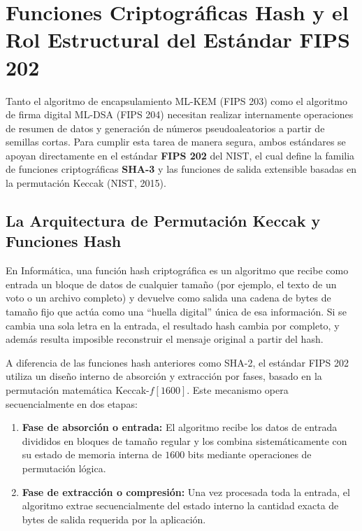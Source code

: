 \section{Funciones Criptográficas Hash y el Rol Estructural del Estándar FIPS 202}

Tanto el algoritmo de encapsulamiento ML-KEM (FIPS 203) como el algoritmo de firma digital ML-DSA (FIPS 204) necesitan realizar internamente operaciones de resumen de datos y generación de números pseudoaleatorios a partir de semillas cortas. Para cumplir esta tarea de manera segura, ambos estándares se apoyan directamente en el estándar \textbf{FIPS 202} del NIST, el cual define la familia de funciones criptográficas \textbf{SHA-3} y las funciones de salida extensible basadas en la permutación Keccak (NIST, 2015).

\subsection{La Arquitectura de Permutación Keccak y Funciones Hash}

En Informática, una función hash criptográfica es un algoritmo que recibe como entrada un bloque de datos de cualquier tamaño (por ejemplo, el texto de un voto o un archivo completo) y devuelve como salida una cadena de bytes de tamaño fijo que actúa como una ``huella digital'' única de esa información. Si se cambia una sola letra en la entrada, el resultado hash cambia por completo, y además resulta imposible reconstruir el mensaje original a partir del hash.

A diferencia de las funciones hash anteriores como SHA-2, el estándar FIPS 202 utiliza un diseño interno de absorción y extracción por fases, basado en la permutación matemática Keccak-$f[1600]$. Este mecanismo opera secuencialmente en dos etapas:

\begin{enumerate}
	\item \textbf{Fase de absorción o entrada:} El algoritmo recibe los datos de entrada divididos en bloques de tamaño regular y los combina sistemáticamente con su estado de memoria interna de $1600$ bits mediante operaciones de permutación lógica.

	\item \textbf{Fase de extracción o compresión:} Una vez procesada toda la entrada, el algoritmo extrae secuencialmente del estado interno la cantidad exacta de bytes de salida requerida por la aplicación.
\end{enumerate}

